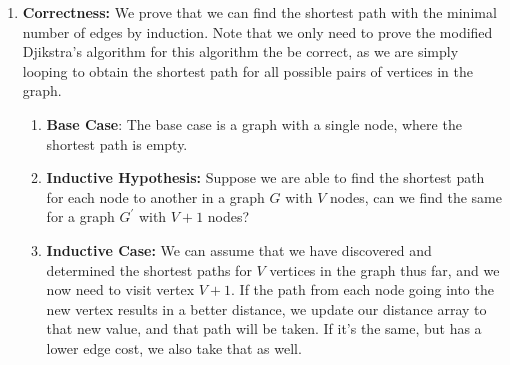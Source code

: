 \documentclass{article}
\begin{document}
\begin{enumerate}
\begin{enumerate}
            \item \textbf{Correctness: } We prove that we can find the shortest path with the minimal number of edges by induction. Note that we only need to prove the modified Djikstra's algorithm for this algorithm the be correct, as we are simply looping to obtain the shortest path for all possible pairs of vertices in the graph.
                \begin{enumerate}
                    \item \textbf{Base Case}: The base case is a graph with a single node, where the shortest path is empty.
                    \item \textbf{Inductive Hypothesis: } Suppose we are able to find the shortest path for each node to another
                    in a graph $G$ with $V$ nodes, can we find the same for a graph $G^\prime$ with $V + 1$ nodes?
                    \item \textbf{Inductive Case: } We can assume that we have discovered and determined the shortest paths
                    for $V$ vertices in the graph thus far, and we now need to visit vertex $V + 1$. If the path
                    from each node going into the new vertex results in a better distance, we update our distance
                    array to that new value, and that path will be taken. If it's the same, but has a lower
                    edge cost, we also take that as well. 
                \end{enumerate}
                
        \end{enumerate}
\end{enumerate}
\end{document}
